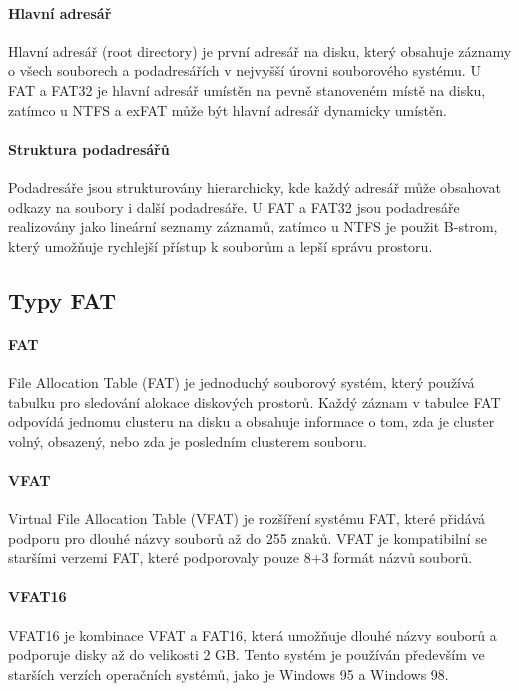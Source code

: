 \paragraph{Hlavní adresář}
Hlavní adresář (root directory) je první adresář na disku, který obsahuje záznamy o všech souborech a podadresářích v nejvyšší úrovni souborového systému. U FAT a FAT32 je hlavní adresář umístěn na pevně stanoveném místě na disku, zatímco u NTFS a exFAT může být hlavní adresář dynamicky umístěn.

\paragraph{Struktura podadresářů}
Podadresáře jsou strukturovány hierarchicky, kde každý adresář může obsahovat odkazy na soubory i další podadresáře. U FAT a FAT32 jsou podadresáře realizovány jako lineární seznamy záznamů, zatímco u NTFS je použit B-strom, který umožňuje rychlejší přístup k souborům a lepší správu prostoru.

\subsection{Typy FAT}
\paragraph{FAT}
File Allocation Table (FAT) je jednoduchý souborový systém, který používá tabulku pro sledování alokace diskových prostorů. Každý záznam v tabulce FAT odpovídá jednomu clusteru na disku a obsahuje informace o tom, zda je cluster volný, obsazený, nebo zda je posledním clusterem souboru.

\paragraph{VFAT}
Virtual File Allocation Table (VFAT) je rozšíření systému FAT, které přidává podporu pro dlouhé názvy souborů až do 255 znaků. VFAT je kompatibilní se staršími verzemi FAT, které podporovaly pouze 8+3 formát názvů souborů.

\paragraph{VFAT16}
VFAT16 je kombinace VFAT a FAT16, která umožňuje dlouhé názvy souborů a podporuje disky až do velikosti 2 GB. Tento systém je používán především ve starších verzích operačních systémů, jako je Windows 95 a Windows 98.

